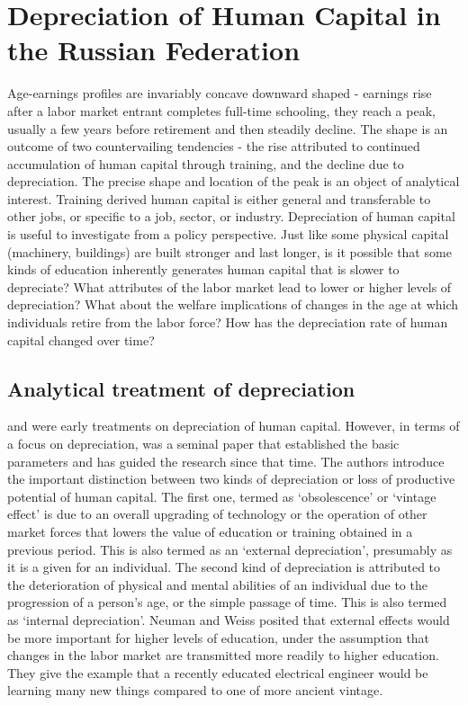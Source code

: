 \documentclass[12pt,a4paper]{article}
\numberwithin{equation}{section}
\begin{document}
\section{Depreciation of Human Capital in the Russian Federation}

Age-earnings profiles are invariably concave downward shaped - earnings rise after a labor market entrant completes full-time schooling, they reach a peak, usually a few years before retirement and then steadily decline. The shape is an outcome of two countervailing tendencies - the rise attributed to continued accumulation of human capital through training, and the decline due to depreciation. The precise shape and location of the peak is an object of analytical interest. Training derived human capital is either general and transferable to other jobs, or specific to a job, sector, or industry. Depreciation of human capital is useful to investigate from a policy perspective. Just like some physical capital (machinery, buildings) are built stronger and last longer, is it possible that some kinds of education inherently generates human capital that is slower to depreciate? What attributes of the labor market lead to lower or higher levels of depreciation? What about the welfare implications of changes in the age at which individuals retire from the labor force? How has the depreciation rate of human capital changed over time? 

\subsection{Analytical treatment of depreciation} 

\cite{rosen1976}  and \cite{mincer1982} were early treatments on depreciation of human capital. However, in terms of a focus on depreciation, \cite{neuman1995} was a seminal paper that established the basic parameters and has guided the research since that time. The authors introduce the important distinction between two kinds of depreciation or loss of productive potential of human capital. The first one, termed as `obsolescence' or `vintage effect' is due to an overall upgrading of technology or the operation of other market forces that lowers the value of education or training obtained in a previous period. This is also termed as an `external depreciation', presumably as it is a given for an individual. The second kind of depreciation is attributed to the deterioration of physical and mental abilities of an individual due to the progression of a person's age, or the simple passage of time. This is also termed as `internal depreciation'. Neuman and Weiss posited that external effects would be more important for higher levels of education, under the assumption that changes in the labor market are transmitted more readily to higher education. They give the example that a recently educated electrical engineer would be learning many new things compared to one of more ancient vintage. 
\end{document}
